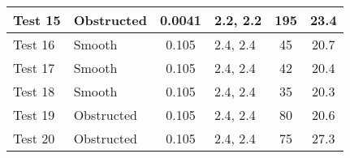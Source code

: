 \begin{table}[!h]
\begin{center}
\begin{tabular}{|l|l|c|l|c|c|}
Test 15    &  Obstructed    &  0.0041           &  2.2, 2.2  &  195             &  23.4              \\ \hline
Test 16    &  Smooth        &  0.105            &  2.4, 2.4  &  45              &  20.7              \\ \hline
Test 17    &  Smooth        &  0.105            &  2.4, 2.4  &  42              &  20.4              \\ \hline
Test 18    &  Smooth        &  0.105            &  2.4, 2.4  &  35              &  20.3              \\ \hline
Test 19    &  Obstructed    &  0.105            &  2.4, 2.4  &  80              &  20.6              \\ \hline
Test 20    &  Obstructed    &  0.105            &  2.4, 2.4  &  75              &  27.3              \\ \hline
\end{tabular}
\end{center}
\end{table}

